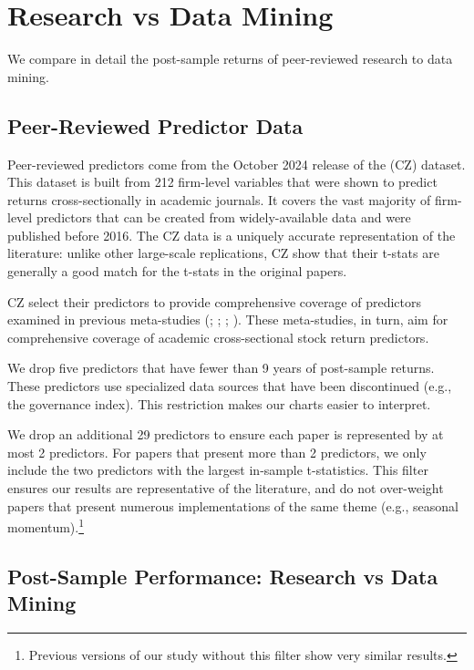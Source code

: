 \section{Research vs Data Mining}\label{sec:pubvs}

We compare in detail the post-sample returns of peer-reviewed research to data mining. 

\subsection{Peer-Reviewed Predictor Data} \label{sec:pubvs-data-pub}

Peer-reviewed predictors come from the October 2024 release of the \citet{ChenZimmermann2021}  (CZ) dataset.  This dataset is built from 212 firm-level variables that were shown to predict returns cross-sectionally in academic journals. It covers the vast majority of firm-level predictors that can be created from widely-available data and were published before 2016. The CZ data is a uniquely accurate representation of the literature: unlike other large-scale replications, CZ show that their t-stats are generally a good match for the t-stats in the original papers.

CZ select their predictors to provide comprehensive coverage of predictors examined in previous  meta-studies (\citealt{mclean2016does}; \citealt{harvey2016and}; \citealt{green2017characteristics}; \citealt{Hou2020Replicating}). These meta-studies, in turn, aim for comprehensive coverage of academic cross-sectional stock return predictors. 

We drop five predictors that have fewer than 9 years of post-sample returns.  These predictors use specialized data sources that have been discontinued (e.g., the \citet{gompers2003corporate} governance index). This restriction makes our charts easier to interpret.

We drop an additional 29 predictors to ensure each paper is represented by at most 2 predictors. For papers that present more than 2 predictors, we only include the two predictors with the largest in-sample t-statistics. This filter ensures our results are representative of the literature, and do not over-weight papers that present numerous implementations of the same theme (e.g.,  seasonal momentum).\footnote{Previous versions of our study without this filter show very similar results.}

\subsection{Post-Sample Performance: Research vs Data Mining}\label{sec:pubvs-results}

